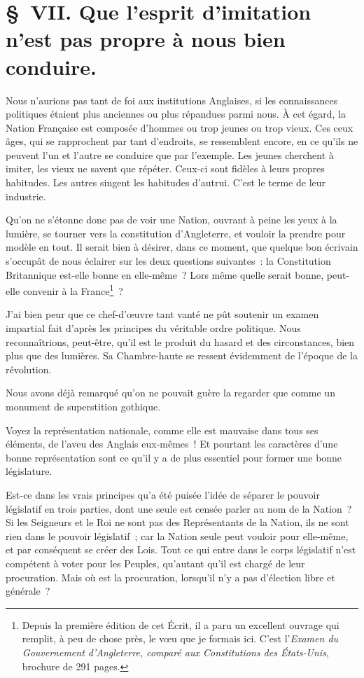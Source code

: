 \documentclass[french,twoside]{book} %
\begin{document}
\section[{§ VII. Que l’esprit d’imitation n’est pas propre à nous bien conduire.}]{§ VII. Que l’esprit d’imitation n’est pas propre à nous bien conduire.}
\noindent Nous n’aurions pas tant de foi aux institutions Anglaises, si les connaissances politiques étaient plus anciennes ou plus répandues parmi nous. À cet égard, la Nation Française est composée d’hommes ou trop jeunes ou trop vieux. Ces ceux âges, qui se rapprochent par tant d’endroits, se ressemblent encore, en ce qu’ils ne peuvent l’un et l’autre se conduire que par l’exemple. Les jeunes cherchent à imiter, les vieux ne savent que répéter. Ceux-ci sont fidèles à leurs propres habitudes. Les autres singent les habitudes d’autrui. C’est le terme de leur industrie.\par
Qu’on ne s’étonne donc pas de voir une Nation, ouvrant à peine les yeux à la lumière, se tourner vers la constitution d’Angleterre, et vouloir la prendre pour modèle en tout. Il serait bien à désirer, dans ce moment, que quelque bon écrivain s’occupât de nous éclairer sur les deux questions suivantes : la Constitution Britannique est-elle bonne en elle-même ? Lors même quelle serait bonne, peut-elle convenir à la France\footnote{Depuis la première édition de cet Écrit, il a paru un excellent ouvrage qui remplit, à peu de chose près, le vœu que je formais ici. C’est l’{\itshape Examen du Gouvernement d’Angleterre, comparé aux Constitutions des États-Unis}, brochure de 291 pages.} ?\par
J’ai bien peur que ce chef-d’œuvre tant vanté ne pût soutenir un examen impartial fait d’après les principes du véritable ordre politique. Nous reconnaîtrions, peut-être, qu’il est le produit du hasard et des circonstances, bien plus que des lumières. Sa Chambre-haute se ressent évidemment de l’époque de la révolution.\par
Nous avons déjà remarqué qu’on ne pouvait guère la regarder que comme un monument de superstition gothique.\par
Voyez la représentation nationale, comme elle est mauvaise dans tous ses éléments, de l’aveu des Anglais eux-mêmes ! Et pourtant les caractères d’une bonne représentation sont ce qu’il y a de plus essentiel pour former une bonne législature.\par
Est-ce dans les vrais principes qu’a été puisée l’idée de séparer le pouvoir législatif en trois parties, dont une seule est censée parler au nom de la Nation ? Si les Seigneurs et le Roi ne sont pas des Représentants de la Nation, ils ne sont rien dans le pouvoir législatif ; car la Nation seule peut vouloir pour elle-même, et par conséquent se créer des Lois. Tout ce qui entre dans le corps législatif n’est compétent à voter pour les Peuples, qu’autant qu’il est chargé de leur procuration. Mais où est la procuration, lorsqu’il n’y a pas d’élection libre et générale ?\par
\end{document}
